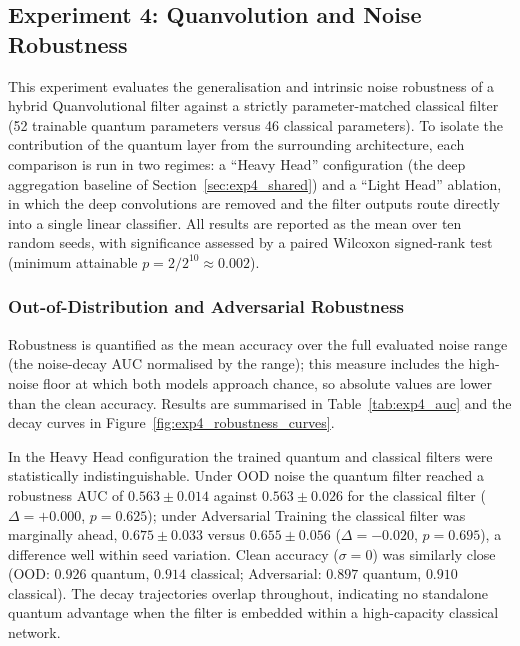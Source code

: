 
\subsection{Experiment 4: Quanvolution and Noise Robustness}
\label{sec:exp4_results}

This experiment evaluates the generalisation and intrinsic noise robustness of a hybrid Quanvolutional filter against a strictly parameter-matched classical filter (52 trainable quantum parameters versus 46 classical parameters). To isolate the contribution of the quantum layer from the surrounding architecture, each comparison is run in two regimes: a ``Heavy Head'' configuration (the deep aggregation baseline of Section~\ref{sec:exp4_shared}) and a ``Light Head'' ablation, in which the deep convolutions are removed and the filter outputs route directly into a single linear classifier. All results are reported as the mean over ten random seeds, with significance assessed by a paired Wilcoxon signed-rank test (minimum attainable $p = 2/2^{10} \approx 0.002$).

\subsubsection{Out-of-Distribution and Adversarial Robustness}

Robustness is quantified as the mean accuracy over the full evaluated noise range (the noise-decay AUC normalised by the range); this measure includes the high-noise floor at which both models approach chance, so absolute values are lower than the clean accuracy. Results are summarised in Table~\ref{tab:exp4_auc} and the decay curves in Figure~\ref{fig:exp4_robustness_curves}.

In the Heavy Head configuration the trained quantum and classical filters were statistically indistinguishable. Under OOD noise the quantum filter reached a robustness AUC of \(0.563 \pm 0.014\) against \(0.563 \pm 0.026\) for the classical filter (\(\Delta = +0.000\), \(p = 0.625\)); under Adversarial Training the classical filter was marginally ahead, \(0.675 \pm 0.033\) versus \(0.655 \pm 0.056\) (\(\Delta = -0.020\), \(p = 0.695\)), a difference well within seed variation. Clean accuracy (\(\sigma = 0\)) was similarly close (OOD: \(0.926\) quantum, \(0.914\) classical; Adversarial: \(0.897\) quantum, \(0.910\) classical). The decay trajectories overlap throughout, indicating no standalone quantum advantage when the filter is embedded within a high-capacity classical network.


